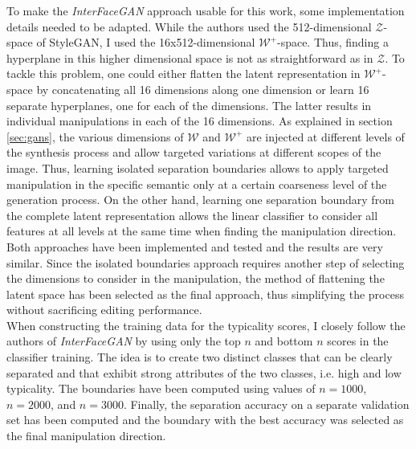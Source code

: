 To make the \textit{InterFaceGAN} approach usable for this work, some implementation details needed to be adapted. While the authors used the 512-dimensional $\mathcal{Z}$-space of StyleGAN, I used the 16x512-dimensional $\mathcal{W^+}$-space. Thus, finding a hyperplane in this higher dimensional space is not as straightforward as in $\mathcal{Z}$. To tackle this problem, one could either flatten the latent representation in $\mathcal{W^+}$-space by concatenating all 16 dimensions along one dimension or learn 16 separate hyperplanes, one for each of the dimensions. The latter results in individual manipulations in each of the 16 dimensions. As explained in section \ref{sec:gans}, the various dimensions of $\mathcal{W}$ and $\mathcal{W^+}$ are injected at different levels of the synthesis process and allow targeted variations at different scopes of the image. Thus, learning isolated separation boundaries allows to apply targeted manipulation in the specific semantic only at a certain coarseness level of the generation process. On the other hand, learning one separation boundary from the complete latent representation allows the linear classifier to consider all features at all levels at the same time when finding the manipulation direction. Both approaches have been implemented and tested and the results are very similar. Since the isolated boundaries approach requires another step of selecting the dimensions to consider in the manipulation, the method of flattening the latent space has been selected as the final approach, thus simplifying the process without sacrificing editing performance. \\
When constructing the training data for the typicality scores, I closely follow the authors of \textit{InterFaceGAN} by using only the top $n$ and bottom $n$ scores in the classifier training. The idea is to create two distinct classes that can be clearly separated and that exhibit strong attributes of the two classes, i.e. high and low typicality. The boundaries have been computed using values of $n=1000$, $n=2000$, and $n=3000$. Finally, the separation accuracy on a separate validation set has been computed and the boundary with the best accuracy was selected as the final manipulation direction. \\

